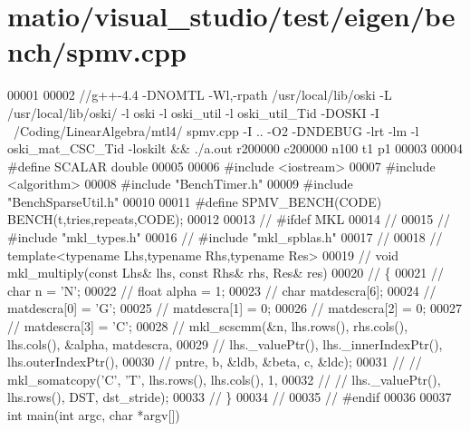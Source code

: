 \hypertarget{matio_2visual__studio_2test_2eigen_2bench_2spmv_8cpp_source}{}\section{matio/visual\+\_\+studio/test/eigen/bench/spmv.cpp}
\label{matio_2visual__studio_2test_2eigen_2bench_2spmv_8cpp_source}

\begin{DoxyCode}
00001 
00002 \textcolor{comment}{//g++-4.4 -DNOMTL  -Wl,-rpath /usr/local/lib/oski -L /usr/local/lib/oski/ -l oski -l oski\_util -l
       oski\_util\_Tid  -DOSKI -I ~/Coding/LinearAlgebra/mtl4/  spmv.cpp  -I .. -O2 -DNDEBUG -lrt  -lm -l oski\_mat\_CSC\_Tid 
       -loskilt && ./a.out r200000 c200000 n100 t1 p1}
00003 
00004 \textcolor{preprocessor}{#define SCALAR double}
00005 
00006 \textcolor{preprocessor}{#include <iostream>}
00007 \textcolor{preprocessor}{#include <algorithm>}
00008 \textcolor{preprocessor}{#include "BenchTimer.h"}
00009 \textcolor{preprocessor}{#include "BenchSparseUtil.h"}
00010 
00011 \textcolor{preprocessor}{#define SPMV\_BENCH(CODE) BENCH(t,tries,repeats,CODE);}
00012 
00013 \textcolor{comment}{// #ifdef MKL}
00014 \textcolor{comment}{//}
00015 \textcolor{comment}{// #include "mkl\_types.h"}
00016 \textcolor{comment}{// #include "mkl\_spblas.h"}
00017 \textcolor{comment}{//}
00018 \textcolor{comment}{// template<typename Lhs,typename Rhs,typename Res>}
00019 \textcolor{comment}{// void mkl\_multiply(const Lhs& lhs, const Rhs& rhs, Res& res)}
00020 \textcolor{comment}{// \{}
00021 \textcolor{comment}{//   char n = 'N';}
00022 \textcolor{comment}{//   float alpha = 1;}
00023 \textcolor{comment}{//   char matdescra[6];}
00024 \textcolor{comment}{//   matdescra[0] = 'G';}
00025 \textcolor{comment}{//   matdescra[1] = 0;}
00026 \textcolor{comment}{//   matdescra[2] = 0;}
00027 \textcolor{comment}{//   matdescra[3] = 'C';}
00028 \textcolor{comment}{//   mkl\_scscmm(&n, lhs.rows(), rhs.cols(), lhs.cols(), &alpha, matdescra,}
00029 \textcolor{comment}{//              lhs.\_valuePtr(), lhs.\_innerIndexPtr(), lhs.outerIndexPtr(),}
00030 \textcolor{comment}{//              pntre, b, &ldb, &beta, c, &ldc);}
00031 \textcolor{comment}{// //   mkl\_somatcopy('C', 'T', lhs.rows(), lhs.cols(), 1,}
00032 \textcolor{comment}{// //                 lhs.\_valuePtr(), lhs.rows(), DST, dst\_stride);}
00033 \textcolor{comment}{// \}}
00034 \textcolor{comment}{//}
00035 \textcolor{comment}{// #endif}
00036 
00037 \textcolor{keywordtype}{int} main(\textcolor{keywordtype}{int} argc, \textcolor{keywordtype}{char} *argv[])

\end{DoxyCode}
